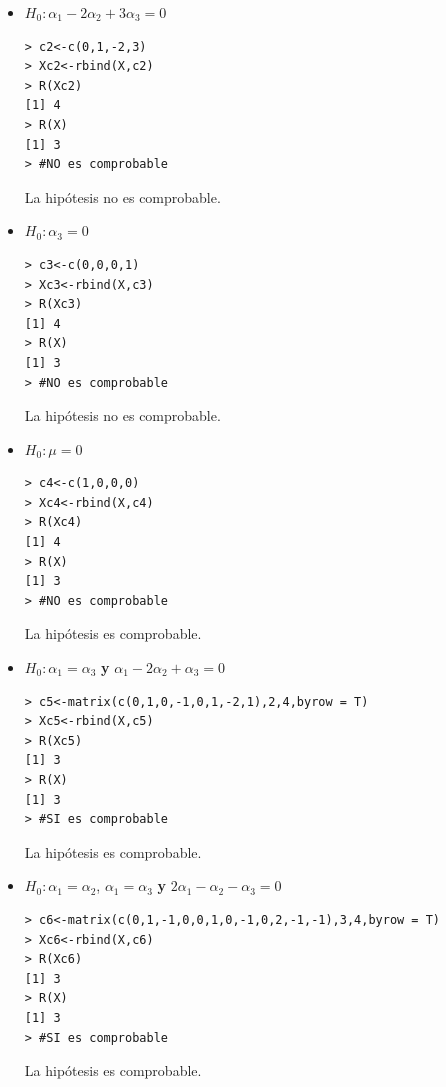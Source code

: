 \documentclass[12pt,a4paper]{report}
\begin{document}
\begin{itemize}
\begin{itemize}
\item $H_0:\alpha_1 - 2\alpha_2 +3\alpha_3 =0$\\
\begin{verbatim}
> c2<-c(0,1,-2,3)
> Xc2<-rbind(X,c2)
> R(Xc2)
[1] 4
> R(X)
[1] 3
> #NO es comprobable
\end{verbatim}
La hipótesis no es comprobable.
\item $H_0:\alpha_3 =0$\\
\begin{verbatim}
> c3<-c(0,0,0,1)
> Xc3<-rbind(X,c3)
> R(Xc3) 
[1] 4
> R(X)
[1] 3
> #NO es comprobable
\end{verbatim}
La hipótesis no es comprobable.
\item $H_0:\mu =0$\\
\begin{verbatim}
> c4<-c(1,0,0,0)
> Xc4<-rbind(X,c4)
> R(Xc4)
[1] 4
> R(X)
[1] 3
> #NO es comprobable
\end{verbatim}
La hipótesis es comprobable.

\item $H_0:\alpha_1 = \alpha_3$ {\bf y} $\alpha_1 - 2\alpha_2 +\alpha_3 =0$\\
\begin{verbatim}
> c5<-matrix(c(0,1,0,-1,0,1,-2,1),2,4,byrow = T)
> Xc5<-rbind(X,c5)
> R(Xc5) 
[1] 3
> R(X)
[1] 3
> #SI es comprobable
\end{verbatim}
La hipótesis es comprobable.
\item $H_0:\alpha_1 = \alpha_2$, $\alpha_1 = \alpha_3$ {\bf y} $2\alpha_1 - \alpha_2 -\alpha_3 =0$\\
\begin{verbatim}
> c6<-matrix(c(0,1,-1,0,0,1,0,-1,0,2,-1,-1),3,4,byrow = T)
> Xc6<-rbind(X,c6)
> R(Xc6) 
[1] 3
> R(X)
[1] 3
> #SI es comprobable
\end{verbatim}
La hipótesis es comprobable.
\end{itemize}



\end{itemize}
\end{document}
